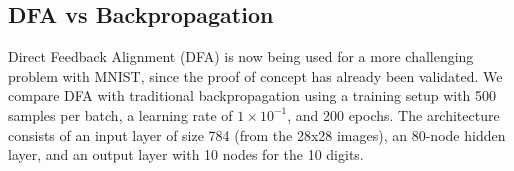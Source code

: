 \documentclass[english]{article}
\begin{document}
\subsection{DFA vs Backpropagation}







Direct Feedback Alignment (DFA) is now being used for a more challenging problem with MNIST, since the proof of concept has already been validated. We compare DFA with traditional backpropagation using a training setup with 500 samples per batch, a learning rate of \(1 \times 10^{-1}\), and 200 epochs. The architecture consists of an input layer of size 784 (from the 28x28 images), an 80-node hidden layer, and an output layer with 10 nodes for the 10 digits.
\end{document}
